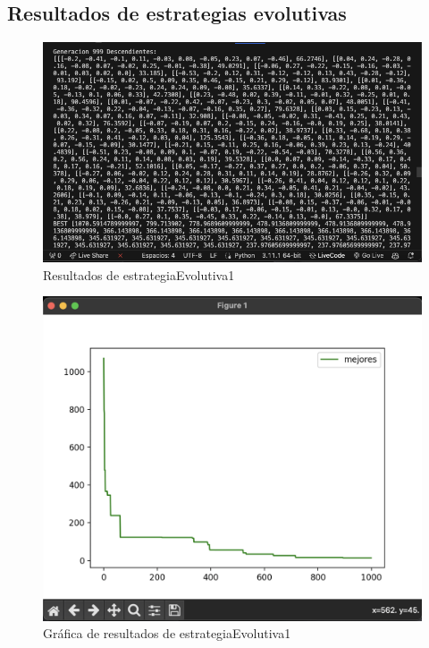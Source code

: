 \documentclass{report}
\begin{document}
\subsection{Resultados de estrategias evolutivas}
\begin{figure}[H]
    \centering
    \includegraphics[width=1\textwidth]{evolutiva1.png}
    \caption{Resultados de estrategiaEvolutiva1}
\end{figure}
\begin{figure}[H]
    \centering
    \includegraphics[width=1\textwidth]{graficaev1.png}
    \caption{Gráfica de resultados de estrategiaEvolutiva1}
\end{figure}
\end{document}
